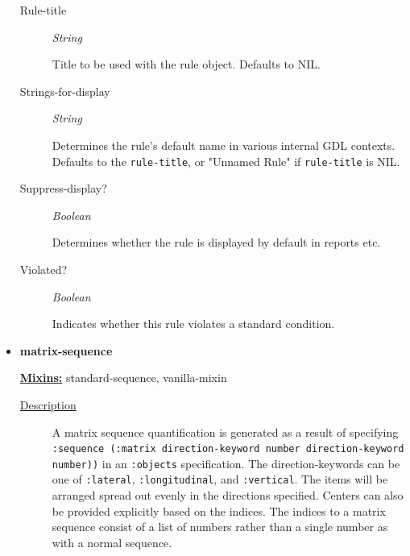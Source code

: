 \documentclass [11pt]{book}
\begin{document}
\begin{itemize}
\begin{description}
\item [Rule-title]
\emph{String}

 Title to be used with the rule object. Defaults to NIL.




\item [Strings-for-display]
\emph{String}

 Determines the rule's default name in various internal GDL contexts. Defaults to
the \texttt{rule-title}, or "Unnamed Rule" if \texttt{rule-title} is NIL.




\item [Suppress-display?]
\emph{Boolean}

 Determines whether the rule is displayed by default in reports etc.




\item [Violated?]
\emph{Boolean}

 Indicates whether this rule violates a standard condition.




\end{description}







\item {}
\label{prim:matrix-sequence}
\textbf{matrix-sequence}


\textbf{
\underline{Mixins:}} standard-sequence, vanilla-mixin





\begin{description}

\item [
\underline{Description}]


A matrix sequence quantification is
generated as a result of specifying \texttt{:sequence (:matrix
direction-keyword number direction-keyword number))} in an
\texttt{:objects} specification. The direction-keywords can be one of
\texttt{:lateral}, \texttt{:longitudinal}, and \texttt{:vertical}. The
items will be arranged spread out evenly in the directions specified.
Centers can also be provided explicitly based on the indices.  The
indices to a matrix sequence consist of a list of numbers rather than
a single number as with a normal sequence.




\end{description}
\end{itemize}
\end{document}
